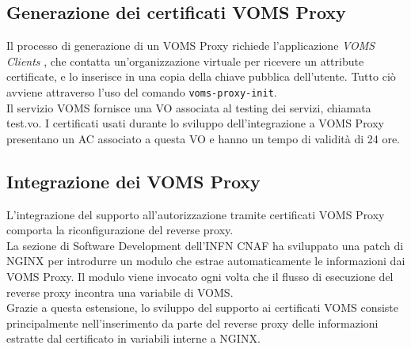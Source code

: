 \subsection{Generazione dei certificati VOMS Proxy}
Il processo di generazione di un VOMS Proxy richiede l'applicazione \textit{VOMS Clients} \cite{VOMS_client}, che contatta un'organizzazione virtuale per ricevere un attribute 
certificate, e lo inserisce in una copia della chiave pubblica dell'utente. Tutto ciò avviene attraverso l'uso del comando \texttt{voms-proxy-init}. 
\\Il servizio VOMS fornisce una VO associata al testing dei servizi, chiamata test.vo. I certificati usati durante lo sviluppo 
dell'integrazione a VOMS Proxy presentano un AC associato a questa VO e hanno un tempo di validità di 24 ore.   

\subsection{Integrazione dei VOMS Proxy}
L'integrazione del supporto all'autorizzazione tramite certificati VOMS Proxy comporta la riconfigurazione del reverse proxy.
\\ La sezione di Software Development dell'INFN CNAF ha sviluppato una patch di NGINX \cite{voms_nginx} per introdurre un modulo che estrae automaticamente le informazioni dai VOMS Proxy.
 Il modulo viene invocato ogni volta che il flusso di esecuzione del reverse proxy incontra una variabile di VOMS.
\\ Grazie a questa estensione, lo sviluppo del supporto ai certificati VOMS consiste principalmente nell'inserimento da parte del reverse proxy 
delle informazioni estratte dal certificato in variabili interne a NGINX. 

